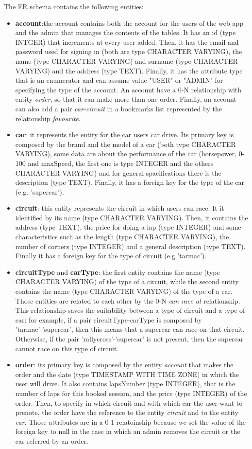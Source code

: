 The ER schema contains the following entities:
\begin{itemize}
	\item \textbf{account}:the account contains both the account for the users of the web app and the admin that manages the contents of the tables. It has an id (type INTGER) that increments at every user added. Then, it has the email and password used for signing in (both are type CHARACTER VARYING), the name (type CHARACTER VARYING) and surname (type CHARACTER VARYING) and the address (type TEXT). Finally, it has the attribute type that is an enumerator and can assume value "USER" or "ADMIN" for specifying the type of the account. An account have a 0-N relationship with entity \textit{order}, so that it can make more than one order. Finally, an account can also add a pair \textit{car-circuit} in a bookmarks list represented by the relationship \textit{favourite}.
	\item \textbf{car}: it represents the entity for the car users car drive. Its primary key is composed by the brand and the model of a car (both type CHARACTER VARYING), some data are about the performance of the car (horsepower, 0-100 and maxSpeed, the first one is type INTEGER and the others CHARACTER VARYING) and for general spacifications there is the description (type TEXT). Finally, it has a foreign key for the type of the car (e.g. 'supercar').
	\item \textbf{circuit}: this entity represents the circuit in which users can race. It it identified by its name (type CHARACTER VARYING). Then, it contains the address (type TEXT), the price for doing a lap (type INTEGER) and some characteristics such as the length (type CHARACTER VARYING), the number of corners (type INTEGER) and a general description (type TEXT). Finally it has a foreign key for the type of circuit (e.g 'tarmac'). 
	\item \textbf{circuitType} and \textbf{carType}: the first entity contains the name (type CHARACTER VARYING) of the type of a circuit, while the second entity contains the name (type CHARACTER VARYING) of the type of a car. Those entities are related to each other by the 0-N \textit{can race at} relationship. This relationship saves the suitability between a type of circuit and a type of car: for example, if a pair circuitType-carType is composed by 'tarmac'-'supercar', then this means that a supercar can race on that circuit. Otherwise, if the pair 'rallycross'-'supercar' is not present, then the supercar cannot race on this type of circuit.
	\item \textbf{order}: its primary key is composed by the entity \textit{account} that makes the order and the date (type TIMESTAMP WITH TIME ZONE) in which the user will drive. It also contains lapsNumber (type INTEGER), that is the number of laps for this booked session, and the price (type INTEGER) of the order. Then, to specify in which circuit and with which car the user want to prenote, the order have the reference to the entity \textit{circuit} and to the entity \textit{car}. Those attributes are in a 0-1 relatoinship because we set the value of the foreign key to null in the case in which an admin removes the circuit or the car referred by an order.
\end{itemize}

